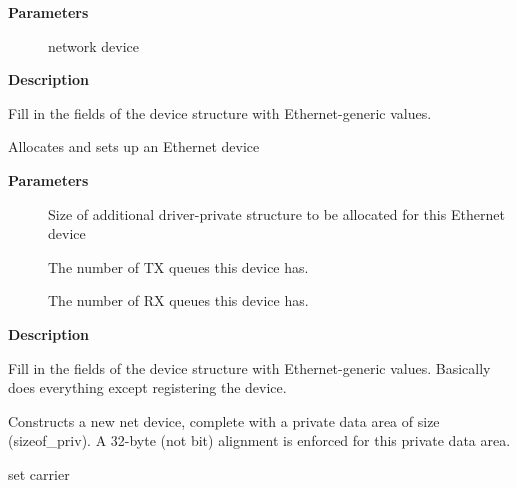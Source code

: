 \documentclass[a4paper,8pt,english]{sphinxmanual}
\begin{document}
\textbf{Parameters}
\begin{description}
\item[{}] \leavevmode
network device

\end{description}

\textbf{Description}

Fill in the fields of the device structure with Ethernet-generic values.

\begin{fulllineitems}
\label{networking/kapi:c.alloc_etherdev_mqs}
Allocates and sets up an Ethernet device

\end{fulllineitems}


\textbf{Parameters}
\begin{description}
\item[{}] \leavevmode
Size of additional driver-private structure to be allocated
for this Ethernet device

\item[{}] \leavevmode
The number of TX queues this device has.

\item[{}] \leavevmode
The number of RX queues this device has.

\end{description}

\textbf{Description}

Fill in the fields of the device structure with Ethernet-generic
values. Basically does everything except registering the device.

Constructs a new net device, complete with a private data area of
size (sizeof\_priv).  A 32-byte (not bit) alignment is enforced for
this private data area.

\begin{fulllineitems}
\label{networking/kapi:c.netif_carrier_on}
set carrier

\end{fulllineitems}
\end{document}
